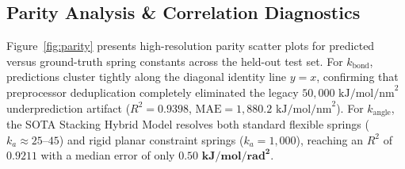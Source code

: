 \documentclass[11pt,a4paper]{article}
\begin{document}
\begin{table}[htbp]
\centering
\caption{Percentage of test predictions within absolute error tolerances ($\text{kJ/mol/rad}^2$).}
\label{tab:tolerance}
\end{table}

\subsection{Parity Analysis \& Correlation Diagnostics}
Figure~\ref{fig:parity} presents high-resolution parity scatter plots for predicted versus ground-truth spring constants across the held-out test set. For $k_{\text{bond}}$, predictions cluster tightly along the diagonal identity line $y = x$, confirming that preprocessor deduplication completely eliminated the legacy $50{,}000\text{ kJ/mol/nm}^2$ underprediction artifact ($R^2 = \mathbf{0.9398}$, $\text{MAE} = 1{,}880.2\text{ kJ/mol/nm}^2$). For $k_{\text{angle}}$, the SOTA Stacking Hybrid Model resolves both standard flexible springs ($k_a \approx 25\text{--}45$) and rigid planar constraint springs ($k_a = 1{,}000$), reaching an $R^2$ of $\mathbf{0.9211}$ with a median error of only $\mathbf{0.50\text{ kJ/mol/rad}^2}$.
\end{document}
